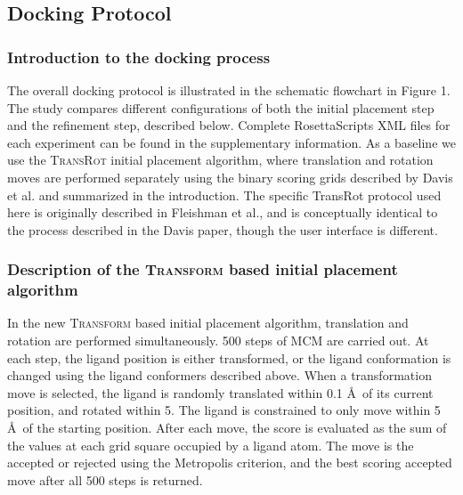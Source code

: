 \subsection{Docking Protocol}
\subsubsection{Introduction to the docking process}
The overall docking protocol is illustrated in the schematic flowchart in Figure 1.
The study compares different configurations of both the initial placement step and the refinement step, described below.
Complete RosettaScripts XML files for each experiment can be found in the supplementary information.
As a baseline we use the \textsc{TransRot} initial placement algorithm, where translation and rotation moves are performed separately using the binary scoring grids described by Davis et al.\citep{Davis:2009bf} and summarized in the introduction.
The specific TransRot protocol used here is originally described in Fleishman et al.\citep{Fleishman:2011ji}, and is conceptually identical to the process described in the Davis paper, though the user interface is different. 

\subsubsection{Description of the \textsc{Transform} based initial placement algorithm}

In the new \textsc{Transform} based initial placement algorithm, translation and rotation are performed simultaneously.
500 steps of MCM are carried out.
At each step, the ligand position is either transformed, or the ligand conformation is changed using the ligand conformers described above.
When a transformation move is selected, the ligand is randomly translated within 0.1 \AA\ of its current position, and rotated within 5\textdegree.
The ligand is constrained to only move within 5 \AA\ of the starting position.
After each move, the score is evaluated as the sum of the values at each grid square occupied by a ligand atom.
The move is the accepted or rejected using the Metropolis criterion, and the best scoring accepted move after all 500 steps is returned.

